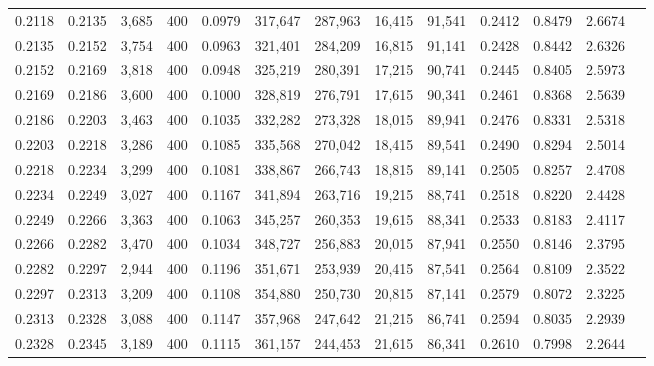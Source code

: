 \begin{tabular}{rrrrrrrrrrrrr}
0.2118 & 0.2135 &  3,685 &   400 &                                     0.0979 & 317,647 & 287,963 &  16,415 &  91,541 & 0.2412 & 0.8479 & 2.6674 \\
0.2135 & 0.2152 &  3,754 &   400 &                                     0.0963 & 321,401 & 284,209 &  16,815 &  91,141 & 0.2428 & 0.8442 & 2.6326 \\
0.2152 & 0.2169 &  3,818 &   400 &                                     0.0948 & 325,219 & 280,391 &  17,215 &  90,741 & 0.2445 & 0.8405 & 2.5973 \\
0.2169 & 0.2186 &  3,600 &   400 &                                     0.1000 & 328,819 & 276,791 &  17,615 &  90,341 & 0.2461 & 0.8368 & 2.5639 \\
0.2186 & 0.2203 &  3,463 &   400 &                                     0.1035 & 332,282 & 273,328 &  18,015 &  89,941 & 0.2476 & 0.8331 & 2.5318 \\
0.2203 & 0.2218 &  3,286 &   400 &                                     0.1085 & 335,568 & 270,042 &  18,415 &  89,541 & 0.2490 & 0.8294 & 2.5014 \\
0.2218 & 0.2234 &  3,299 &   400 &                                     0.1081 & 338,867 & 266,743 &  18,815 &  89,141 & 0.2505 & 0.8257 & 2.4708 \\
0.2234 & 0.2249 &  3,027 &   400 &                                     0.1167 & 341,894 & 263,716 &  19,215 &  88,741 & 0.2518 & 0.8220 & 2.4428 \\
0.2249 & 0.2266 &  3,363 &   400 &                                     0.1063 & 345,257 & 260,353 &  19,615 &  88,341 & 0.2533 & 0.8183 & 2.4117 \\
0.2266 & 0.2282 &  3,470 &   400 &                                     0.1034 & 348,727 & 256,883 &  20,015 &  87,941 & 0.2550 & 0.8146 & 2.3795 \\
0.2282 & 0.2297 &  2,944 &   400 &                                     0.1196 & 351,671 & 253,939 &  20,415 &  87,541 & 0.2564 & 0.8109 & 2.3522 \\
0.2297 & 0.2313 &  3,209 &   400 &                                     0.1108 & 354,880 & 250,730 &  20,815 &  87,141 & 0.2579 & 0.8072 & 2.3225 \\
0.2313 & 0.2328 &  3,088 &   400 &                                     0.1147 & 357,968 & 247,642 &  21,215 &  86,741 & 0.2594 & 0.8035 & 2.2939 \\
0.2328 & 0.2345 &  3,189 &   400 &                                     0.1115 & 361,157 & 244,453 &  21,615 &  86,341 & 0.2610 & 0.7998 & 2.2644 \\

\end{tabular}
